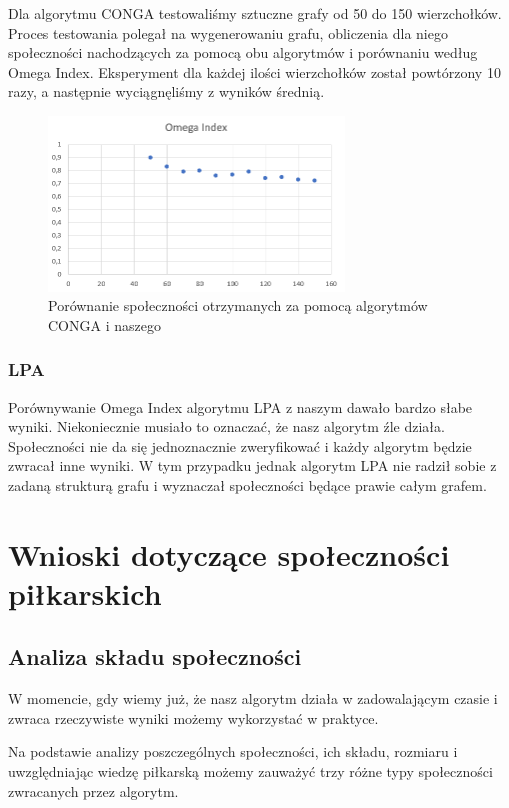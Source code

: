 \documentclass{article}
\begin{document}
Dla algorytmu CONGA testowaliśmy sztuczne grafy od 50 do 150 wierzchołków. Proces testowania polegał na wygenerowaniu grafu, obliczenia dla niego społeczności nachodzących za pomocą obu algorytmów i porównaniu według Omega Index. Eksperyment dla każdej ilości wierzchołków został powtórzony 10 razy, a następnie wyciągnęliśmy z wyników średnią.

\begin{figure}[H]
    \centering
    \includegraphics[width=0.7\textwidth]{images/wyk2.png}
    \caption{Porównanie społeczności otrzymanych za pomocą algorytmów CONGA i naszego}
    \label{fig:my_label}
\end{figure}

\subsubsection{LPA}

Porównywanie Omega Index algorytmu LPA z naszym dawało bardzo słabe wyniki. Niekoniecznie musiało to oznaczać, że nasz algorytm źle działa. Społeczności nie da się jednoznacznie zweryfikować i każdy algorytm będzie zwracał inne wyniki. W tym przypadku jednak algorytm LPA nie radził sobie z zadaną strukturą grafu i wyznaczał społeczności będące prawie całym grafem.

\section{Wnioski dotyczące społeczności piłkarskich}

\subsection{Analiza składu społeczności}

W momencie, gdy wiemy już, że nasz algorytm działa w zadowalającym czasie i zwraca rzeczywiste wyniki możemy wykorzystać w praktyce.

Na podstawie analizy poszczególnych społeczności, ich składu, rozmiaru i uwzględniając wiedzę piłkarską możemy zauważyć trzy różne typy społeczności zwracanych przez algorytm.
\end{document}
